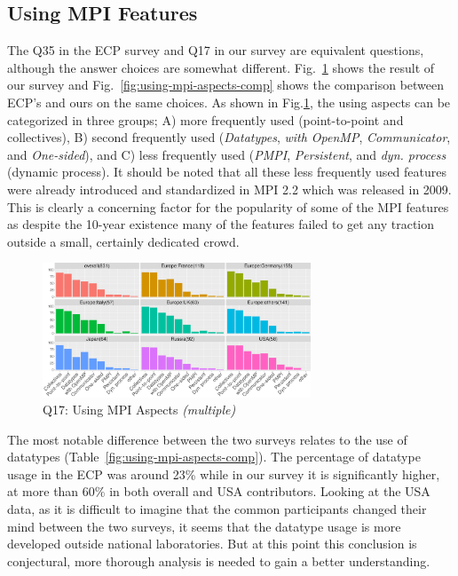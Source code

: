 \documentclass[preprint,5p,times]{elsarticle}
\def\myquote#1{{\it #1}}
\newcommand{\revision}[2]{{\color{blue}#2}}
\begin{document}
\subsection{Using MPI Features}\label{sec:mpi-aspects}

The Q35 in the ECP survey and Q17 in our survey are equivalent
questions, although the answer choices are somewhat
different. Fig.~\ref{fig:using-mpi-aspects} shows the result of our
survey and Fig.~\ref{fig:using-mpi-aspects-comp} shows the comparison
between ECP's and ours on the same choices. As shown in
Fig.\ref{fig:using-mpi-aspects}, the
using aspects can be categorized in three groups; A) more frequently
used (point-to-point and collectives), B) second frequently used
(\myquote{Datatypes}, \myquote{with OpenMP}, \myquote{Communicator}, and \myquote{One-sided}), and C) less
frequently used (\myquote{PMPI}, \myquote{Persistent}, and
\myquote{dyn. process} (dynamic process).
%
It should be noted that all these less frequently used features were already
introduced and standardized in MPI 2.2 which was \revision{release}{released} in 2009. This is
clearly a concerning factor for the popularity of some of the MPI features as
despite the 10-year existence many of the features failed to get any traction
outside a small, certainly dedicated crowd.

\begin{figure}[tb]
  \begin{center}
    \includegraphics[width=8.0cm]{R-scripts/Q17.pdf}
    \vspace{-2mm}
    \caption{Q17: Using MPI Aspects {\it(multiple)}}
    \label{fig:using-mpi-aspects}
  \end{center}
\end{figure}

The most notable difference between the two surveys relates to the use of
datatypes (Table~\ref{fig:using-mpi-aspects-comp}). The percentage of datatype usage
in the ECP was around 23\% while in our survey it is significantly higher, at
more than 60\% in both overall and USA contributors.
%
Looking at the USA data, as it is difficult to imagine that the common
participants changed their mind between the two surveys, it seems that the
datatype usage is more developed outside national laboratories. But at this
point this conclusion is conjectural, more thorough analysis is needed to gain a
better understanding.
\end{document}
